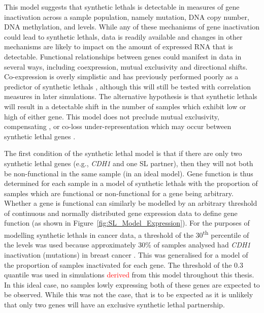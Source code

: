 This model suggests that \glspl{synthetic lethal} is detectable in measures of gene inactivation across a sample population, namely \gls{mutation}, \acrshort{DNA} copy number, \acrshort{DNA} \gls{methylation}, and  levels. While any of these mechanisms of gene inactivation could lead to \glspl{synthetic lethal},  data is readily available and changes in other mechanisms are likely to impact on the amount of expressed \acrshort{RNA} that is detectable. Functional relationships between genes could manifest in  data in several ways, including coexpression, mutual exclusivity and directional shifts. Co-expression is overly simplistic \citep{Lu2015} and has previously performed poorly as a predictor of \glspl{synthetic lethal} \citep{Jerby2014}, although this will still be tested with correlation measures in later simulations. The alternative hypothesis is that \glspl{synthetic lethal} will result in a detectable shift in the number of samples which exhibit low or high  of either gene. This model does not preclude mutual exclusivity, compensating , or co-loss under-representation which may occur between \gls{synthetic lethal} genes \citep{Wappett2016, Lu2015}. 

The first condition of the \gls{synthetic lethal} model is that if there are only two \gls{synthetic lethal} genes (e.g., \textit{CDH1} and one SL partner), then they will not both be non-functional in the same sample (in an ideal model). Gene function is thus determined for each sample in a model of \glspl{synthetic lethal} with the proportion of samples which are functional or non-functional for a gene being arbitrary. Whether a gene is functional can similarly be modelled by an arbitrary threshold of continuous and normally distributed \gls{gene expression} data to define gene function (as shown in Figure~\ref{fig:SL_Model_Expression}). For the purposes of modelling \glspl{synthetic lethal} in cancer  data, a threshold of the 30\textsuperscript{th} percentile of the  levels was used because approximately 30\% of samples analysed had \textit{CDH1} inactivation (mutations) in breast cancer \citep{TCGA2012}. This was generalised for a model of the proportion of samples inactivated for each gene. The threshold of the 0.3 quantile was used in simulations \textcolor{red}{derived} from this model throughout this thesis. In this ideal case, no samples lowly expressing both of these genes are expected to be observed. While this was not the case, that is to be expected as it is unlikely that only two genes will have an exclusive \gls{synthetic lethal} partnership.

